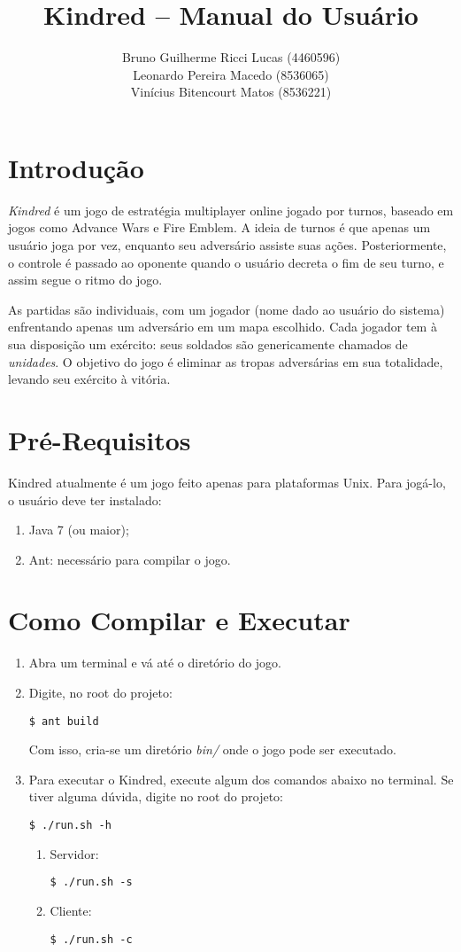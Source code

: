 \documentclass{article}
\title{
    Kindred -- Manual do Usuário
}
\author{
    Bruno Guilherme Ricci Lucas (4460596)\\
    Leonardo Pereira Macedo (8536065)\\
    Vinícius Bitencourt Matos (8536221)
}
\begin{document}
\maketitle

\section{Introdução}

\emph{Kindred} é um jogo de estratégia multiplayer online jogado por turnos, baseado em jogos como Advance Wars e Fire Emblem. A ideia de turnos é que apenas um usuário joga por vez, enquanto seu adversário assiste suas ações. Posteriormente, o controle é passado ao oponente quando o usuário decreta o fim de seu turno, e assim segue o ritmo do jogo. \par

As partidas são individuais, com um jogador (nome dado ao usuário do sistema) enfrentando apenas um adversário em um mapa escolhido. Cada jogador tem à sua disposição um exército: seus soldados são genericamente chamados de \emph{unidades}. O objetivo do jogo é eliminar as tropas adversárias em sua totalidade, levando seu exército à vitória.

\section{Pré-Requisitos}
Kindred atualmente é um jogo feito apenas para plataformas Unix. Para jogá-lo, o usuário deve ter instalado:
    \begin{enumerate}
        \item Java 7 (ou maior);
        \item Ant: necessário para compilar o jogo.
    \end{enumerate}

\section{Como Compilar e Executar}
    \begin{enumerate}
    \item Abra um terminal e vá até o diretório do jogo.
    \item Digite, no root do projeto: \par
            \texttt{\$ ant build} \par
            Com isso, cria-se um diretório \emph{bin/} onde o jogo pode ser executado.
    \item Para executar o Kindred, execute algum dos comandos abaixo no terminal. Se tiver alguma dúvida, digite no root do projeto: \par
            \texttt{\$ ./run.sh -h} \par
        \begin{enumerate}
        \item Servidor: \par
                \texttt{\$ ./run.sh -s}
        \item Cliente: \par
                \texttt{\$ ./run.sh -c}
        \end{enumerate}
    \end{enumerate}
\end{document}
